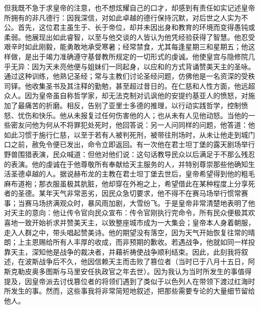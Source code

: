 但我既不急于求皇帝的注意，也不想炫耀自己的口才，却感到有责任如实记述皇帝所拥有的非凡德行：因我深信，对如此卓越的德行保持沉默，对后世之人实为不公。首先，这位君主虽生于、长于帝位，却并未因出身和教育的环境而变得愚钝或柔弱。他展现出如此睿智，以至与他交谈的人皆认为他凭经验获得了智慧。他忍受艰辛时如此刚毅，能勇敢地承受寒暑；经常禁食，尤其每逢星期三和星期五；他这样做，是出于竭力准确遵守基督教所规定的一切形式的虔诚。他使皇宫与隐修院几乎无异：因为天未亮他便与姐妹们一同起身，以应和的方式背诵赞美天主的圣咏。通过这种训练，他熟记圣经；常与主教们讨论圣经问题，仿佛他是一名资深的受秩司铎。他收集圣书及其注释的勤勉，甚至超过昔日的。在仁慈和人性方面，他远超众人。因为皇帝虽自称哲学家，却无法克制对讥讽他的安提约基亚人的愤怒，对施加了最痛苦的折磨。相反，告别了亚里士多德的推理，以行动实践哲学，控制愤怒、忧伤和快乐。他从未报复过任何伤害他的人；也从未有人见他动怒。当他的一些密友问他为何从不将罪犯处死时，他回答说：另一人问同样的问题，他答道：他如此习惯于施行仁慈，以至于若有人被判死刑，被带往刑场时，从未让他走到城门口之前，赦免令便已发出，命令立即返回。有一次他在君士坦丁堡的露天剧场举行野兽围猎表演，民众喊道：但他对他们说：这句话教导民众以后满足于不那么残忍的表演。他的虔诚在于他尊敬所有奉献给天主服务的人，并特别尊崇那些他确知生活圣德卓越的人。据说赫布龙的主教在君士坦丁堡去世后，皇帝希望得到他的粗毛麻布道袍；那衣服虽极其肮脏，他却穿在外袍之上，希望借此在某种程度上分享死者的圣德。某年天气非常恶劣，因民众急切要求，他不得不在赛马场举行惯常赛事；当赛马场挤满观众时，暴风雨加剧，大雪纷飞。于是皇帝非常清楚地表明了他对天主的意向：他让传令官向民众宣布：传令官刚执行完命令，所有民众便极其欢喜地一致开始祈求并赞美天主，以致整座城市成为一大集会；皇帝本人身着朝服，走入人群之中，带头唱起赞美诗。他的期望没有落空，因为天气开始恢复往常的晴朗；上主恩赐给所有人丰厚的收成，而非预期的歉收。若遇战争，他就如同一样投靠天主，深知他是战争的裁决者，并藉祈祷使战争顺利结束。因此，此刻我将叙述，在波斯战争后不久，他因信赖天主而击败了篡位者（当时已于八月十五日，阿斯克勒皮奥多图斯与马里安任执政官之年去世）。因为我认为当时所发生的事值得提及，因皇帝派去讨伐篡位者的将领们遇到了类似于以色列人在带领下渡过红海时所发生的事。然而，这些事我将非常简短地叙述，把那些需要专论的大量细节留给他人。\par

